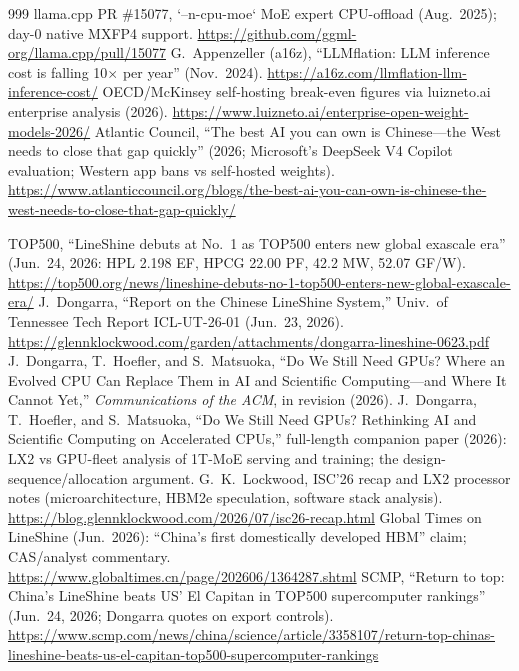 \begin{thebibliography}{999}
 llama.cpp PR \#15077, `--n-cpu-moe` MoE expert CPU-offload (Aug.\ 2025); day-0 native MXFP4 support. \url{https://github.com/ggml-org/llama.cpp/pull/15077}
 G.~Appenzeller (a16z), ``LLMflation: LLM inference cost is falling 10$\times$ per year'' (Nov.\ 2024). \url{https://a16z.com/llmflation-llm-inference-cost/}
 OECD/McKinsey self-hosting break-even figures via luizneto.ai enterprise analysis (2026). \url{https://www.luizneto.ai/enterprise-open-weight-models-2026/}
 Atlantic Council, ``The best AI you can own is Chinese---the West needs to close that gap quickly'' (2026; Microsoft's DeepSeek V4 Copilot evaluation; Western app bans vs self-hosted weights). \url{https://www.atlanticcouncil.org/blogs/the-best-ai-you-can-own-is-chinese-the-west-needs-to-close-that-gap-quickly/}

 TOP500, ``LineShine debuts at No.\ 1 as TOP500 enters new global exascale era'' (Jun.\ 24, 2026: HPL 2.198 EF, HPCG 22.00 PF, 42.2 MW, 52.07 GF/W). \url{https://top500.org/news/lineshine-debuts-no-1-top500-enters-new-global-exascale-era/}
 J.~Dongarra, ``Report on the Chinese LineShine System,'' Univ.\ of Tennessee Tech Report ICL-UT-26-01 (Jun.\ 23, 2026). \url{https://glennklockwood.com/garden/attachments/dongarra-lineshine-0623.pdf}
 J.~Dongarra, T.~Hoefler, and S.~Matsuoka, ``Do We Still Need GPUs? Where an Evolved CPU Can Replace Them in AI and Scientific Computing---and Where It Cannot Yet,'' \emph{Communications of the ACM}, in revision (2026).
 J.~Dongarra, T.~Hoefler, and S.~Matsuoka, ``Do We Still Need GPUs? Rethinking AI and Scientific Computing on Accelerated CPUs,'' full-length companion paper (2026): LX2 vs GPU-fleet analysis of 1T-MoE serving and training; the design-sequence/allocation argument.
 G.~K.~Lockwood, ISC'26 recap and LX2 processor notes (microarchitecture, HBM2e speculation, software stack analysis). \url{https://blog.glennklockwood.com/2026/07/isc26-recap.html}
 Global Times on LineShine (Jun.\ 2026): ``China's first domestically developed HBM'' claim; CAS/analyst commentary. \url{https://www.globaltimes.cn/page/202606/1364287.shtml}
 SCMP, ``Return to top: China's LineShine beats US' El Capitan in TOP500 supercomputer rankings'' (Jun.\ 24, 2026; Dongarra quotes on export controls). \url{https://www.scmp.com/news/china/science/article/3358107/return-top-chinas-lineshine-beats-us-el-capitan-top500-supercomputer-rankings}


\end{thebibliography}
